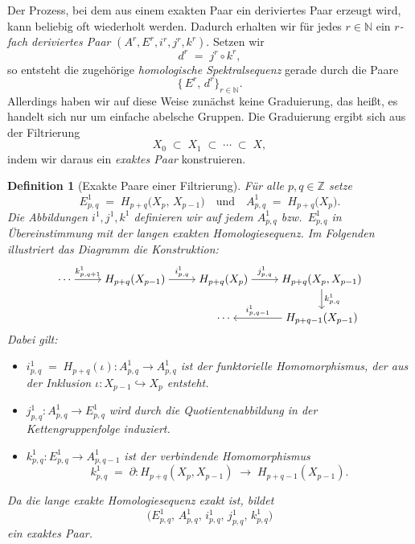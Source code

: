 \documentclass[12pt, hidelinks]{article}
\numberwithin{conj}{section}
\newtheorem{definition}[conj]{Definition}
\newcommand{\Z}{\mathbb{Z}}
\begin{document}
Der Prozess, bei dem aus einem exakten Paar ein deriviertes Paar erzeugt wird, kann beliebig oft wiederholt werden. Dadurch erhalten wir für jedes $r \in \mathbb{N}$ ein \emph{$r$-fach deriviertes Paar} $(A^r, E^r, i^r, j^r, k^r)$. Setzen wir
\[
    d^r \;=\; j^r \circ k^r,
\]
so entsteht die zugehörige \emph{homologische Spektralsequenz} gerade durch die Paare
\[
    \{\,E^r,\, d^r\}_{r \in \mathbb{N}}.
\]
Allerdings haben wir auf diese Weise zunächst keine Graduierung, das heißt, es handelt sich nur um einfache abelsche Gruppen. Die Graduierung ergibt sich aus der Filtrierung
\[
    X_0 \;\subset\; X_1 \;\subset\; \cdots \;\subset\; X,
\]
indem wir daraus ein \emph{exaktes Paar} konstruieren.

\begin{definition}[Exakte Paare einer Filtrierung]\label{exaktFiltration}
    Für alle $p,q \in \Z$ setze
    \[
        E^1_{p,q} \;=\; H_{p+q}\bigl(X_p,\,X_{p-1}\bigr)
        \quad\text{und}\quad
        A^1_{p,q} \;=\; H_{p+q}\bigl(X_p\bigr).
    \]
    Die Abbildungen $i^1, j^1, k^1$ definieren wir auf jedem $A^1_{p,q}$ bzw.\ $E^1_{p,q}$ in Übereinstimmung mit der langen exakten Homologiesequenz. Im Folgenden illustriert das Diagramm die Konstruktion:
    \[
    \begin{tikzcd}[cramped]
        \cdots & H_{p+q}(X_{p-1}) & H_{p+q}(X_{p}) & H_{p+q}(X_{p},X_{p-1}) \\
        & {} & \cdots & H_{p+q-1}(X_{p-1})
        \arrow["{k^1_{p,q+1}}", from=1-1, to=1-2]
        \arrow["{i^1_{p,q}}", from=1-2, to=1-3]
        \arrow["{j^1_{p,q}}", from=1-3, to=1-4]
        \arrow["{k^1_{p,q}}", from=1-4, to=2-4]
        \arrow["{i^1_{p,q-1}}"', from=2-4, to=2-3]
    \end{tikzcd}
    \]
    Dabei gilt:
    \begin{itemize}[nolistsep]
        \item $i^1_{p,q} \;=\; H_{p+q}(\iota) : A^1_{p,q} \to A^1_{p,q}$ ist der funktorielle Homomorphismus, der aus der Inklusion 
              \(\iota: X_{p-1} \hookrightarrow X_p\) entsteht.
        \item $j^1_{p,q} : A^1_{p,q} \to E^1_{p,q}$ wird durch die Quotientenabbildung in der Kettengruppenfolge induziert.
        \item $k^1_{p,q} : E^1_{p,q} \to A^1_{p,q-1}$ ist der \emph{verbindende Homomorphismus}
              \[
                  k^1_{p,q} \;=\; \partial : H_{p+q}(X_p,X_{p-1}) \;\longrightarrow\; H_{p+q-1}(X_{p-1}).
              \]
    \end{itemize}
    Da die lange exakte Homologiesequenz exakt ist, bildet
    \[
        \bigl(E^1_{p,q},\,A^1_{p,q},\,i^1_{p,q},\,j^1_{p,q},\,k^1_{p,q}\bigr)
    \]
    ein \emph{exaktes Paar}.
\end{definition}
\end{document}
